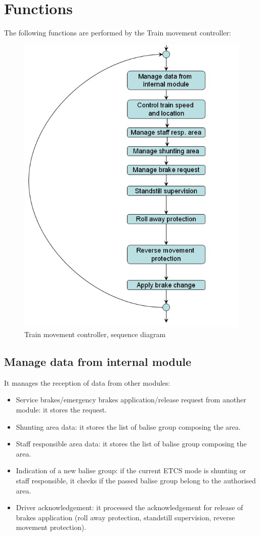 \documentclass[nocc]{template/openetcs_report}
\begin{document}
\section{Functions}
The following functions are performed by the Train movement controller:
\begin{figure}[!h]
  \centering
  \includegraphics[width=\textwidth]{image/evc_train_mvmt_controller}
  \caption{Train movement controller, sequence diagram}
  \label{fig:Train movement controller, sequence diagram}
\end{figure}
\subsection{Manage data from internal module}
It manages the reception of data from other modules:
\begin{itemize}
\item Service brakes/emergency brakes application/release request from another module: it stores the request.
\item Shunting area data: it stores the list of balise group composing the area.
\item Staff responsible area data: it stores the list of balise group composing the area.
\item Indication of a new balise group: if the current ETCS mode is shunting or staff responsible, it checks if the passed balise group belong to the authorised area.
\item Driver acknowledgement: it processed the acknowledgement for release of brakes application (roll away protection, standstill supervision, reverse movement protection).
\end{itemize}
\end{document}
